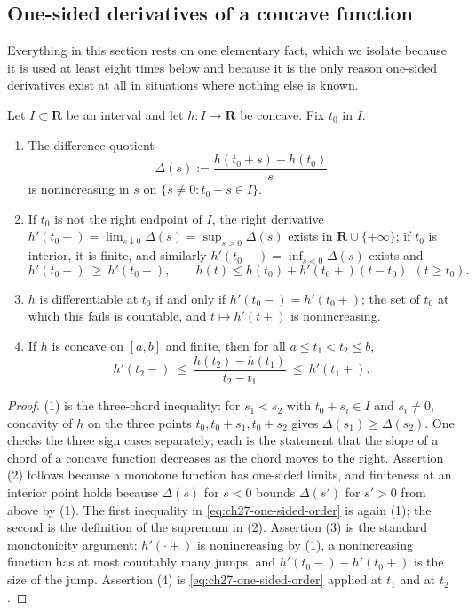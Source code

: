 \subsection{One-sided derivatives of a concave function}
\label{sec:ch27-concave-calculus}

Everything in this section rests on one elementary fact, which we isolate
because it is used at least eight times below and because it is the only
reason one-sided derivatives exist at all in situations where nothing else
is known.

\begin{lemma}
\label{lem:ch27-concave-quotients}
Let \(I\subset\mathbf R\) be an interval and let \(h:I\to\mathbf R\) be
concave.  Fix \(t_0\) in \(I\).
\begin{enumerate}
\item The difference quotient
\[
 \Delta(s):=\frac{h(t_0+s)-h(t_0)}{s}
\]
is nonincreasing in \(s\) on \(\{s\neq0: t_0+s\in I\}\).
\item If \(t_0\) is not the right endpoint of \(I\), the right derivative
\(h'(t_0+)=\lim_{s\downarrow0}\Delta(s)=\sup_{s>0}\Delta(s)\) exists in
\(\mathbf R\cup\{+\infty\}\); if \(t_0\) is interior, it is finite, and
similarly \(h'(t_0-)=\inf_{s<0}\Delta(s)\) exists and
\begin{equation}\label{eq:ch27-one-sided-order}
 h'(t_0-)\ \geq\ h'(t_0+),
 \qquad
 h(t)\leq h(t_0)+h'(t_0+)(t-t_0)\ \ (t\geq t_0).
\end{equation}
\item \(h\) is differentiable at \(t_0\) if and only if
\(h'(t_0-)=h'(t_0+)\); the set of \(t_0\) at which this fails is countable,
and \(t\mapsto h'(t+)\) is nonincreasing.
\item If \(h\) is concave on \([a,b]\) and finite, then for all
\(a\leq t_1<t_2\leq b\),
\begin{equation}\label{eq:ch27-endpoint-sandwich}
 h'(t_2-)\ \leq\ \frac{h(t_2)-h(t_1)}{t_2-t_1}\ \leq\ h'(t_1+).
\end{equation}
\end{enumerate}
\end{lemma}

\begin{proof}
(1) is the three-chord inequality: for \(s_1<s_2\) with \(t_0+s_i\in I\) and
\(s_i\neq0\), concavity of \(h\) on the three points
\(t_0,t_0+s_1,t_0+s_2\) gives \(\Delta(s_1)\geq\Delta(s_2)\).  One checks
the three sign cases separately; each is the statement that the slope of a
chord of a concave function decreases as the chord moves to the right.
Assertion (2) follows because a monotone function has one-sided limits, and
finiteness at an interior point holds because \(\Delta(s)\) for \(s<0\)
bounds \(\Delta(s')\) for \(s'>0\) from above by (1).  The first inequality
in \eqref{eq:ch27-one-sided-order} is again (1); the second is the
definition of the supremum in (2).  Assertion (3) is the standard
monotonicity argument: \(h'(\cdot+)\) is nonincreasing by (1), a
nonincreasing function has at most countably many jumps, and
\(h'(t_0-)-h'(t_0+)\) is the size of the jump.  Assertion (4) is
\eqref{eq:ch27-one-sided-order} applied at \(t_1\) and at \(t_2\).
\end{proof}

